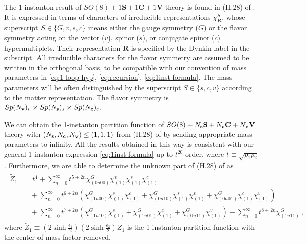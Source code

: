 \documentclass[letterpaper, 11pt]{article}
\def\e{\epsilon}
\begin{document}
{The 1-instanton result of $SO(8) + 1\mathbf{S} + 1\mathbf{C} + 1\mathbf{V}$ theory is found in (H.28) of \cite{DelZotto:2018tcj}.
It is expressed in terms of characters of irreducible representations $\chi_{\mathbf{R}}^S$, whose superscript $S \in \{G,v,s,c\}$ means either the gauge symmetry ($G$) or the flavor symmetry acting on the vector ($v$), spinor ($s$), or conjugate spinor ($c$) hypermultiplets. Their representation $\mathbf{R}$ is specified by the Dynkin label in the subscript. All irreducible characters for the flavor symmetry are assumed to be written in the orthogonal basis, to be compatible with our convention of mass parameters in \eqref{eq:1-loop-hyp}, \eqref{eq:recursion}, \eqref{eq:1inst-formula}. The mass parameters will be often distinguished by the superscript $S \in \{s,c,v\}$ according to the matter representation. The flavor symmetry is $Sp(N_{\bf v})_v \times Sp(N_{\bf s})_s \times Sp(N_{\bf c})_c$.

We can obtain the 1-instanton partition function of $SO(8) + N_{\bf s}\mathbf{S} + N_{\bf c}\mathbf{C} + N_{\bf v}\mathbf{V}$ theory with  $( N_{\bf s},  N_{\bf c}, N_{\bf v}) \leq ( 1,1,1)$ from (H.28) of \cite{DelZotto:2018tcj} by sending appropriate mass parameters to infinity.
All the results obtained in this way is consistent with our general 1-instanton expression \eqref{eq:1inst-formula} up to $t^{20}$ order, where $t \equiv \sqrt{p_1p_2}$. 
Furthermore, we are able to determine the unknown part of (H.28) of \cite{DelZotto:2018tcj} as 
\begin{align}
  \label{eq:SO8-v1s1c1}
  \begin{split}
 \tilde{Z}_1 &=  t^4 + \sum_{n=0}^\infty t^{5+2n} \chi_{(0n00)}^G \chi^v_{(1)}\chi^s_{(1)}\chi^c_{(1)} \\
 &\quad + \sum_{n=0}^\infty t^{6+2n}\left(\chi_{(1n00)}^G \chi^s_{(1)}\chi^c_{(1)}+ \chi_{(0n10)}^G \chi^s_{(1)}\chi^v_{(1)}
  +\chi_{(0n01)}^G \chi^c_{(1)}\chi^v_{(1)}\right)\\
 &\quad  + \sum_{n=0}^\infty t^{7+2n} \left(\chi^G_{(1n10)}\chi^s_{(1)} + \chi^G_{(1n01)}\chi^c_{(1)}+\chi^G_{(0n11)}\chi^v_{(1)}\right)- \sum_{n=0}^\infty t^{8+2n}\chi^G_{(1n11)} \ ,
 \end{split}
\end{align}
where $\tilde{Z}_1 \equiv (2\sinh{\frac{\e_{1}}{2}})(2\sinh{\frac{\e_{2}}{2}})  Z_1$ is the 1-instanton partition function with the center-of-mass factor removed. 


}
\end{document}
